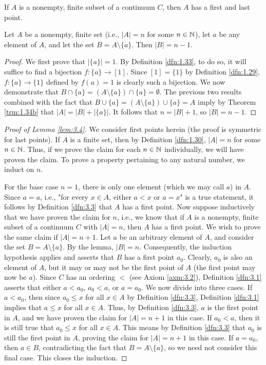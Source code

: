 \documentclass[../main.tex]{subfiles}
\begin{document}
\begin{lemma}\label{lem:3.4}
    If $A$ is a nonempty, finite subset of a continuum $C$, then $A$ has a first and last point.
    \begin{lemma*}
        Let $A$ be a nonempty, finite set \textup{(}i.e., $|A|=n$ for some $n\in\mathbb{N}$\textup{)}, let $a$ be any element of $A$, and let the set $B=A\setminus\{a\}$. Then $|B|=n-1$.
        \begin{proof}
            We first prove that $|\{a\}|=1$. By Definition \ref{dfn:1.33}, to do so, it will suffice to find a bijection $f:\{a\}\to[1]$. Since $[1]=\{1\}$ by Definition \ref{dfn:1.29}, $f:\{a\}\to\{1\}$ defined by $f(a)=1$ is clearly such a bijection. We now demonstrate that $B\cap\{a\}=(A\setminus\{a\})\cap\{a\}=\emptyset$. The previous two results combined with the fact that $B\cup\{a\}=(A\setminus\{a\})\cup\{a\}=A$ imply by Theorem \ref{trm:1.34b} that $|A|=|B|+|\{a\}|$. It follows that $n=|B|+1$, so $|B|=n-1$.
        \end{proof}
    \end{lemma*}
    \begin{proof}[Proof of Lemma \ref{lem:3.4}]
        We consider first points herein (the proof is symmetric for last points). If $A$ is a finite set, then by Definition \ref{dfn:1.30}, $|A|=n$ for some $n\in\mathbb{N}$. Thus, if we prove the claim for each $n\in\mathbb{N}$ individually, we will have proven the claim. To prove a property pertaining to any natural number, we induct on $n$.\par
        For the base case $n=1$, there is only one element (which we may call $a$) in $A$. Since $a=a$, i.e., "for every $x\in A$, either $a<x$ or $a=x$" is a true statement, it follows by Definition \ref{dfn:3.3} that $A$ has a first point. Now suppose inductively that we have proven the claim for $n$, i.e., we know that if $A$ is a nonempty, finite subset of a continuum $C$ with $|A|=n$, then $A$ has a first point. We wish to prove the same claim if $|A|=n+1$. Let $a$ be an arbitrary element of $A$, and consider the set $B=A\setminus\{a\}$. By the lemma, $|B|=n$. Consequently, the induction hypothesis applies and asserts that $B$ has a first point $a_0$. Clearly, $a_0$ is also an element of $A$, but it may or may not be the first point of $A$ (the first point may now be $a$). Since $C$ has an ordering $<$ (see Axiom \ref{axm:3.2}), Definition \ref{dfn:3.1} asserts that either $a<a_0$, $a_0<a$, or $a=a_0$. We now divide into three cases. If $a<a_0$, then since $a_0\leq x$ for all $x\in A$ by Definition \ref{dfn:3.3}, Definition \ref{dfn:3.1} implies that $a\leq x$ for all $x\in A$. Thus, by Definition \ref{dfn:3.3}, $a$ is the first point in $A$, and we have proven the claim for $|A|=n+1$ in this case. If $a_0<a$, then it is still true that $a_0\leq x$ for all $x\in A$. This means by Definition \ref{dfn:3.3} that $a_0$ is still the first point in $A$, proving the claim for $|A|=n+1$ in this case. If $a=a_0$, then $a\in B$, contradicting the fact that $B=A\setminus\{a\}$, so we need not consider this final case. This closes the induction.
    \end{proof}
\end{lemma}
\end{document}
